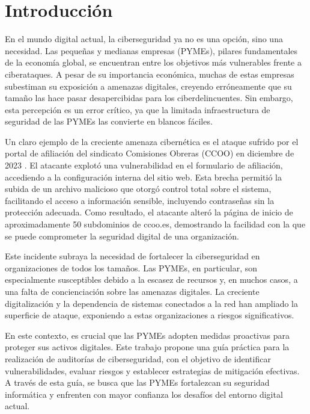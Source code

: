 \documentclass[a4paper, 11pt]{article}
\begin{document}
\section{Introducción}
\setlength{\parskip}{0.5cm}  %

\thispagestyle{nohead}


En el mundo digital actual, la ciberseguridad ya no es una opción, sino una necesidad. Las pequeñas y medianas empresas (PYMEs), pilares fundamentales de la economía global, se encuentran entre los objetivos más vulnerables frente a ciberataques. A pesar de su importancia económica, 
muchas de estas empresas subestiman su exposición a amenazas digitales, creyendo erróneamente que su tamaño las hace pasar desapercibidas para los ciberdelincuentes. Sin embargo, esta percepción es un error crítico, ya que la limitada infraestructura de seguridad de las 
PYMEs las convierte en blancos fáciles. 


Un claro ejemplo de la creciente amenaza cibernética es el ataque sufrido por el portal de afiliación del sindicato Comisiones Obreras (CCOO) en diciembre de 2023 \cite{napalm-ccoo}. El atacante explotó una vulnerabilidad en el formulario de afiliación, accediendo a la configuración interna del sitio web. Esta brecha permitió la subida de un archivo malicioso que otorgó control total sobre el sistema, facilitando el acceso a información sensible, incluyendo contraseñas sin la protección adecuada. Como resultado, el atacante alteró la página de inicio de aproximadamente 50 subdominios de ccoo.es, demostrando la facilidad con la que se puede comprometer la seguridad digital de una organización.


Este incidente subraya la necesidad de fortalecer la ciberseguridad en organizaciones de todos los tamaños. Las PYMEs, en particular, son especialmente susceptibles debido a la escasez de recursos y, en muchos casos, a una falta de concienciación sobre las amenazas digitales. 
La creciente digitalización y la dependencia de sistemas conectados a la red han ampliado la superficie de ataque, exponiendo a estas organizaciones a riesgos significativos.


En este contexto, es crucial que las PYMEs adopten medidas proactivas para proteger sus activos digitales. Este trabajo propone una guía práctica para la realización de auditorías de ciberseguridad, con el objetivo de identificar vulnerabilidades, evaluar riesgos y establecer 
estrategias de mitigación efectivas. A través de esta guía, se busca que las PYMEs fortalezcan su seguridad informática y enfrenten con mayor confianza los desafíos del entorno digital actual.
\end{document}
